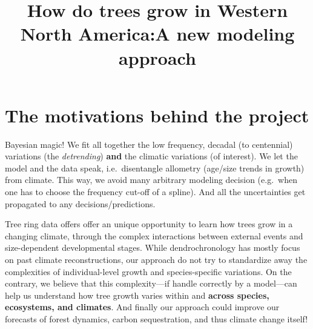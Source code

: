 \documentclass[
  letterpaper,
  DIV=11,
  numbers=noendperiod]{scrartcl}
\title{How do trees grow in Western North America:\newline A new
modeling approach}
\author{}
\date{}
\begin{document}
\maketitle


\section{The motivations behind the
project}\label{the-motivations-behind-the-project}

\begin{tcolorbox}[enhanced jigsaw, left=2mm, rightrule=.15mm, arc=.35mm, breakable, coltitle=black, colback=white, colframe=quarto-callout-tip-color-frame, opacityback=0, bottomtitle=1mm, toptitle=1mm, titlerule=0mm, title=\textcolor{quarto-callout-tip-color}{\faLightbulb}\hspace{0.5em}{The technical motivation}, bottomrule=.15mm, toprule=.15mm, colbacktitle=quarto-callout-tip-color!10!white, leftrule=.75mm, opacitybacktitle=0.6]

Bayesian magic! We fit all together the low frequency, decadal (to
centennial) variations (the \emph{detrending}) \textbf{and} the climatic
variations (of interest). We let the model and the data speak,
i.e.~disentangle allometry (age/size trends in growth) from climate.
This way, we avoid many arbitrary modeling decision (e.g.~when one has
to choose the frequency cut-off of a spline). And all the uncertainties
get propagated to any decisions/predictions.

\end{tcolorbox}

\hfill\break

\begin{tcolorbox}[enhanced jigsaw, left=2mm, rightrule=.15mm, arc=.35mm, breakable, coltitle=black, colback=white, colframe=quarto-callout-tip-color-frame, opacityback=0, bottomtitle=1mm, toptitle=1mm, titlerule=0mm, title=\textcolor{quarto-callout-tip-color}{\faLightbulb}\hspace{0.5em}{The ecological motivation}, bottomrule=.15mm, toprule=.15mm, colbacktitle=quarto-callout-tip-color!10!white, leftrule=.75mm, opacitybacktitle=0.6]

Tree ring data offers offer an unique opportunity to learn how trees
grow in a changing climate, through the complex interactions between
external events and size-dependent developmental stages. While
dendrochronology has mostly focus on past climate reconstructions, our
approach do not try to standardize away the complexities of
individual-level growth and species-specific variations. On the
contrary, we believe that this complexity---if handle correctly by a
model---can help us understand how tree growth varies within and
\textbf{across species, ecosystems, and climates}. And finally our
approach could improve our forecasts of forest dynamics, carbon
sequestration, and thus climate change itself!

\end{tcolorbox}
\end{document}
